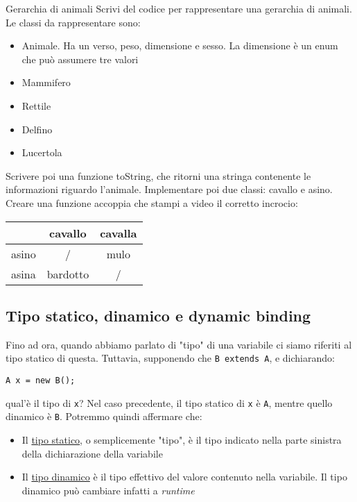 \begin{esercizio}{Gerarchia di animali}
	Scrivi del codice per rappresentare una gerarchia di animali. Le classi da rappresentare sono:
	\begin{itemize}
		\item {\ttfamily Animale}. Ha un {\ttfamily verso}, {\ttfamily peso},  {\ttfamily dimensione} e {\ttfamily sesso}. La dimensione è un enum che può assumere tre valori
		\item {\ttfamily Mammifero}
		\item {\ttfamily Rettile}
		\item {\ttfamily Delfino}
		\item {\ttfamily Lucertola}
	\end{itemize}
	Scrivere poi una funzione {\ttfamily toString}, che ritorni una stringa contenente le informazioni riguardo l'animale.
	\vskip3mm
	Implementare poi due classi: {\ttfamily cavallo} e {\ttfamily asino}. Creare una funzione {\ttfamily accoppia} che stampi a video il corretto incrocio:
	\begin{center}
		\begin{tabular}{ccc}
			\toprule
			      & cavallo  & cavalla \\
			\midrule
			asino & /        & mulo    \\
			asina & bardotto & /       \\
			\bottomrule
		\end{tabular}
	\end{center}

\end{esercizio}
\subsection{Tipo statico, dinamico e dynamic binding}
Fino ad ora, quando abbiamo parlato di "tipo" di una variabile ci siamo riferiti al tipo statico di questa. Tuttavia, supponendo che \verb|B extends A|, e dichiarando:
\begin{center}
	\verb|A x = new B();|
\end{center}
qual'è il tipo di \verb|x|?
\vskip3mm
Nel caso precedente, il tipo statico di \verb|x| è \verb|A|, mentre quello dinamico è \verb|B|. Potremmo quindi affermare che:
\begin{itemize}
	\item Il \underline{tipo statico}, o semplicemente "tipo", è il tipo indicato nella parte sinistra della dichiarazione della variabile
	\item Il \underline{tipo dinamico} è il tipo effettivo del valore contenuto nella variabile. Il tipo dinamico può cambiare infatti a \textit{runtime}
\end{itemize}

